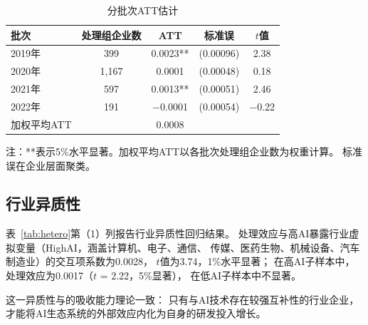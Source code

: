 \documentclass[12pt, a4paper]{article}
\begin{document}
\begin{table}[htbp]
\centering
\caption{分批次ATT估计}
\label{tab:cohort}
\begin{threeparttable}
\begin{tabular}{lcccc}
\toprule
批次 & 处理组企业数 & ATT & 标准误 & $t$值 \\
\midrule
2019年 & 399   & 0.0023** & (0.00096) & 2.38  \\
2020年 & 1,167 & 0.0001   & (0.00048) & 0.18  \\
2021年 & 597   & 0.0013** & (0.00051) & 2.46  \\
2022年 & 191   & $-$0.0001 & (0.00054) & $-$0.22 \\
\midrule
加权平均ATT & & 0.0008 & & \\
\bottomrule
\end{tabular}
\begin{tablenotes}
\small\kaiti
\item 注：**表示5\%水平显著。加权平均ATT以各批次处理组企业数为权重计算。
标准误在企业层面聚类。
\end{tablenotes}
\end{threeparttable}
\end{table}

\subsection{行业异质性}

表~\ref{tab:hetero}第（1）列报告行业异质性回归结果。
处理效应与高AI暴露行业虚拟变量（HighAI，涵盖计算机、电子、通信、
传媒、医药生物、机械设备、汽车制造业）的交互项系数为0.0028，
$t$值为3.74，1\%水平显著；
在高AI子样本中，处理效应为0.0017（$t$ = 2.22，5\%显著），
在低AI子样本中不显著。

这一异质性与\textcite{cohen1990absorptive}的吸收能力理论一致：
只有与AI技术存在较强互补性的行业企业，
才能将AI生态系统的外部效应内化为自身的研发投入增长。
\end{document}
